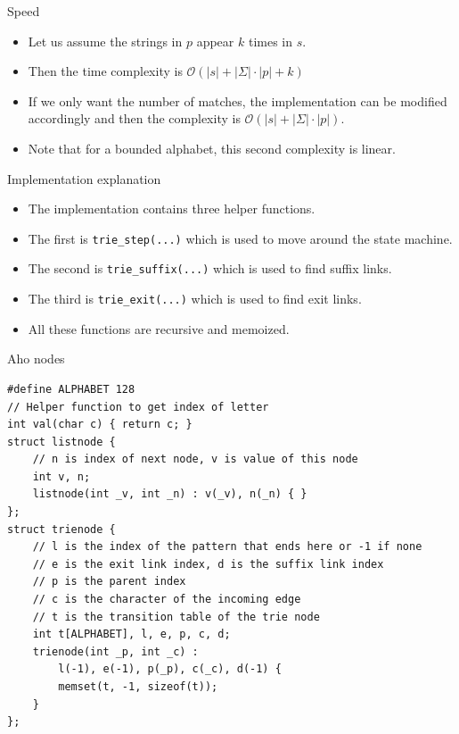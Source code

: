 \documentclass{beamer}
\begin{document}
\begin{frame}[plain]{Speed}
	\begin{itemize}
        \item Let us assume the strings in $p$ appear $k$ times in $s$.
        \item Then the time complexity is $\mathcal{O}(|s| + |\Sigma| \cdot |p| + k)$
        \item If we only want the number of matches, the implementation can be modified accordingly and then the complexity is $\mathcal{O}(|s| + |\Sigma| \cdot |p|)$.
        \item Note that for a bounded alphabet, this second complexity is linear.
    \end{itemize}
\end{frame}

\begin{frame}[plain]{Implementation explanation}
	\begin{itemize}
        \item The implementation contains three helper functions.
        \item The first is \texttt{trie\_step(...)} which is used to move around the state machine.
        \item The second is \texttt{trie\_suffix(...)} which is used to find suffix links.
        \item The third is \texttt{trie\_exit(...)} which is used to find exit links.
        \item All these functions are recursive and memoized.
    \end{itemize}
\end{frame}

\begin{frame}{Aho nodes}
    \scriptsize
    \begin{verbatim}
#define ALPHABET 128
// Helper function to get index of letter
int val(char c) { return c; }
struct listnode {
    // n is index of next node, v is value of this node
    int v, n;
    listnode(int _v, int _n) : v(_v), n(_n) { }
};
struct trienode {
    // l is the index of the pattern that ends here or -1 if none
    // e is the exit link index, d is the suffix link index
    // p is the parent index
    // c is the character of the incoming edge
    // t is the transition table of the trie node
    int t[ALPHABET], l, e, p, c, d;
    trienode(int _p, int _c) :
        l(-1), e(-1), p(_p), c(_c), d(-1) {
        memset(t, -1, sizeof(t));
    }
};
    \end{verbatim}
\end{frame}
\end{document}
